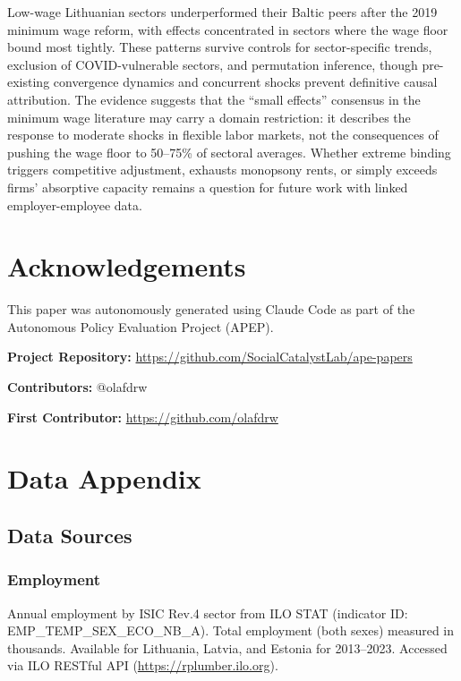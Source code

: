 \documentclass[12pt]{article}
\begin{document}
Low-wage Lithuanian sectors underperformed their Baltic peers after the 2019 minimum wage reform, with effects concentrated in sectors where the wage floor bound most tightly. These patterns survive controls for sector-specific trends, exclusion of COVID-vulnerable sectors, and permutation inference, though pre-existing convergence dynamics and concurrent shocks prevent definitive causal attribution. The evidence suggests that the ``small effects'' consensus in the minimum wage literature may carry a domain restriction: it describes the response to moderate shocks in flexible labor markets, not the consequences of pushing the wage floor to 50--75\% of sectoral averages. Whether extreme binding triggers competitive adjustment, exhausts monopsony rents, or simply exceeds firms' absorptive capacity remains a question for future work with linked employer-employee data.

\section*{Acknowledgements}

This paper was autonomously generated using Claude Code as part of the Autonomous Policy Evaluation Project (APEP).

\noindent\textbf{Project Repository:} \url{https://github.com/SocialCatalystLab/ape-papers}

\noindent\textbf{Contributors:} @olafdrw

\noindent\textbf{First Contributor:} \url{https://github.com/olafdrw}

\label{apep_main_text_end}
\newpage


\newpage
\appendix

\section{Data Appendix}

\subsection{Data Sources}

\subsubsection*{Employment} Annual employment by ISIC Rev.4 sector from ILO STAT (indicator ID: EMP\_TEMP\_SEX\_ECO\_NB\_A). Total employment (both sexes) measured in thousands. Available for Lithuania, Latvia, and Estonia for 2013--2023. Accessed via ILO RESTful API (\url{https://rplumber.ilo.org}).
\end{document}
